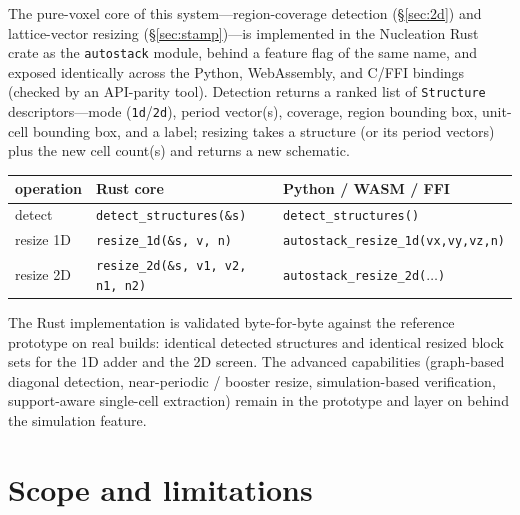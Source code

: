 \documentclass[11pt]{article}
\begin{document}
The pure-voxel core of this system---region-coverage detection
(\S\ref{sec:2d}) and lattice-vector resizing (\S\ref{sec:stamp})---is implemented
in the Nucleation Rust crate as the \texttt{autostack} module, behind a feature
flag of the same name, and exposed identically across the Python, WebAssembly,
and C/FFI bindings (checked by an API-parity tool). Detection returns a ranked
list of \texttt{Structure} descriptors---mode (\texttt{1d}/\texttt{2d}), period
vector(s), coverage, region bounding box, unit-cell bounding box, and a label;
resizing takes a structure (or its period vectors) plus the new cell count(s) and
returns a new schematic.

\begin{center}
\small
\begin{tabular}{@{}lll@{}}
\toprule
operation & Rust core & Python / WASM / FFI \\
\midrule
detect    & \texttt{detect\_structures(\&s)} & \texttt{detect\_structures()} \\
resize 1D & \texttt{resize\_1d(\&s, v, n)}    & \texttt{autostack\_resize\_1d(vx,vy,vz,n)} \\
resize 2D & \texttt{resize\_2d(\&s, v1, v2, n1, n2)} & \texttt{autostack\_resize\_2d($\dots$)} \\
\bottomrule
\end{tabular}
\end{center}

The Rust implementation is validated byte-for-byte against the reference
prototype on real builds: identical detected structures and identical resized
block sets for the 1D adder and the 2D screen. The advanced capabilities
(graph-based diagonal detection, near-periodic / booster resize, simulation-based
verification, support-aware single-cell extraction) remain in the prototype and
layer on behind the simulation feature.

\section{Scope and limitations}
\end{document}
